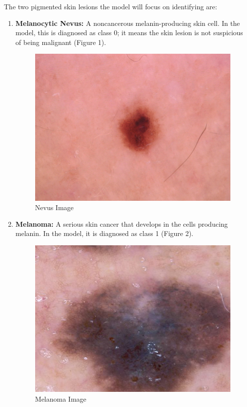 \documentclass[10pt,twocolumn]{article}
\begin{document}
The two pigmented skin lesions the model will focus on identifying are:
\begin{enumerate}
    \item \textbf{Melanocytic Nevus:} A noncancerous melanin-producing skin cell. In the model, this is diagnosed as class 0; it means the skin lesion is not suspicious of being malignant (Figure 1).
    \begin{figure}[h]
    \caption{Nevus Image}
    \includegraphics[scale=0.4]{ISIC_0024335.jpg}\newline
    \end{figure}
    \item \textbf{Melanoma:} A serious skin cancer that develops in the cells producing melanin. In the model, it is diagnosed as class 1 (Figure 2).
    \begin{figure}[h]
    \caption{Melanoma Image}
    \includegraphics[scale=0.4]{aug_mel__10_3539.jpg}\newline
    \end{figure}
 
\end{enumerate}
\end{document}

